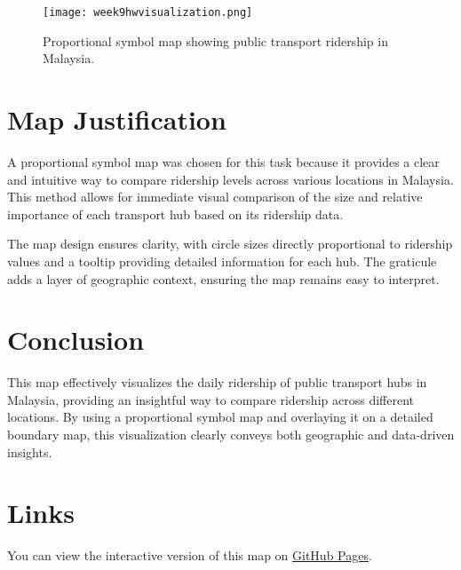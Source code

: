 \documentclass{article}
\begin{document}
\begin{figure}[h!]
    \centering
    \texttt{[image: week9hwvisualization.png]}
    \caption{Proportional symbol map showing public transport ridership in Malaysia.}
\end{figure}

\section*{Map Justification}
A proportional symbol map was chosen for this task because it provides a clear and intuitive way to compare ridership levels across various locations in Malaysia. This method allows for immediate visual comparison of the size and relative importance of each transport hub based on its ridership data.

The map design ensures clarity, with circle sizes directly proportional to ridership values and a tooltip providing detailed information for each hub. The graticule adds a layer of geographic context, ensuring the map remains easy to interpret.

\section*{Conclusion}
This map effectively visualizes the daily ridership of public transport hubs in Malaysia, providing an insightful way to compare ridership across different locations. By using a proportional symbol map and overlaying it on a detailed boundary map, this visualization clearly conveys both geographic and data-driven insights.

\section*{Links}
You can view the interactive version of this map on \href{https://your-github-page-link-here}{GitHub Pages}.
\end{document}
